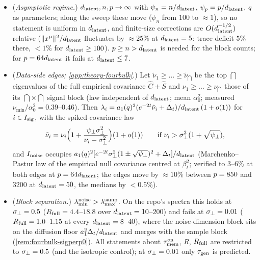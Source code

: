 \begin{assumption}
\begin{itemize}
\item[(H3)] (\emph{Asymptotic regime.}) $d_{\mathrm{latent}},n,p\to\infty$ with $\psi_n=n/d_{\mathrm{latent}}$, $\psi_p=p/d_{\mathrm{latent}}$, $q$ as parameters; along the sweep these move ($\psi_n$ from $100$ to $\approx1$), so no statement is uniform in $d_{\mathrm{latent}}$, and finite-size corrections are $O(d_{\mathrm{latent}}^{-1/2})$ relative ($\|x^\mu\|^2/d_{\mathrm{latent}}$ fluctuates by $\approx25\%$ at $d_{\mathrm{latent}}=5$: trace deficit $5\%$ there, $<1\%$ for $d_{\mathrm{latent}}\ge100$). $p\ge n>d_{\mathrm{latent}}$ is needed for the block counts; for $p=64d_{\mathrm{latent}}$ it fails at $d_{\mathrm{latent}}\le7$.
\item[(H4)] (\emph{Data-side edges; \cref{app:theory-fourbulk}.}) Let $\tilde\nu_1\ge\dots\ge\tilde\nu_{\dint}$ be the top $\dint$ eigenvalues of the full empirical covariance $\hat C+\hat S$ and $\nu_1\ge\dots\ge\nu_{\dint}$ those of its $\dint\times\dint$ signal block (law independent of $d_{\mathrm{latent}}$; mean $\alpha_0^2$; measured $\nu_{\min}/\alpha_0^2=0.39$--$0.46$). Then $\lambda_i=a_1(q)^2(e^{-2t}\tilde\nu_i+\Delta_t)/d_{\mathrm{latent}}\,(1+o(1))$ for $i\in I_{\rm sig}$, with the spiked-covariance law \citep{baik2005phase}
\begin{equation}
\tilde\nu_i=\nu_i\Bigl(1+\frac{\psi_\perp\sigma_{\perp}^2}{\nu_i-\sigma_{\perp}^2}\Bigr)(1+o(1))\qquad\text{if }\nu_i>\sigma_{\perp}^2(1+\sqrt{\psi_\perp}),
\label{eq:bbp-signal-buf}
\end{equation}
and $I_{\rm noise}$ occupies $a_1(q)^2[e^{-2t}\sigma_{\perp}^2(1\pm\sqrt{\psi_\perp})^2+\Delta_t]/d_{\mathrm{latent}}$ (Marchenko--Pastur law of the empirical null covariance centred at $\beta_t^2$; verified to $3$--$6\%$ at both edges at $p=64d_{\mathrm{latent}}$; the edges move by $\approx10\%$ between $p=850$ and $3200$ at $d_{\mathrm{latent}}=50$, the medians by $<0.5\%$).
\item[(H5)] (\emph{Block separation.}) $\lambda^{\rm noise}_{\min}>\lambda^{\rm samp}_{\max}$. On the repo's spectra this holds at $\sigma_{\perp}=0.5$ ($R_{\rm full}=4.4$--$18.8$ over $d_{\mathrm{latent}}=10$--$200$) and fails at $\sigma_{\perp}=0.01$ ($R_{\rm full}=1.0$--$1.15$ at every $d_{\mathrm{latent}}=8$--$40$), where the noise-dimension block sits on the diffusion floor $a_1^2\Delta_t/d_{\mathrm{latent}}$ and merges with the sample block (\cref{rem:fourbulk-sigperp0}). All statements about $\tau_{\mathrm{mem}}^{\rm on}$, $R$, $R_{\rm full}$ are restricted to $\sigma_{\perp}=0.5$ (and the isotropic control); at $\sigma_{\perp}=0.01$ only $\tau_{\mathrm{gen}}$ is predicted.
\end{itemize}
\end{assumption}

